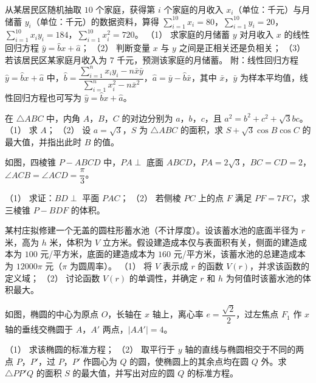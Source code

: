 \begin{question}
从某居民区随机抽取 $10$ 个家庭，获得第 $i$ 个家庭的月收入 $x_i$（单位：千元）与月储蓄 $y_i$（单位：千元）的数据资料，算得 $\sum\limits_{i=1}^{10}x_i=80$，$\sum\limits_{i=1}^{10}y_i=20$，$\sum\limits_{i=1}^{10}x_iy_i=184$，$\sum\limits_{i=1}^{10}x_i^2=720$。
（1） 求家庭的月储蓄 $y$ 对月收入 $x$ 的线性回归方程 $\hat y=\hat bx+\hat a$；
（2） 判断变量 $x$ 与 $y$ 之间是正相关还是负相关；
（3） 若该居民区某家庭月收入为 $7$ 千元，预测该家庭的月储蓄。
附：线性回归方程 $\hat y=\hat bx+\hat a$ 中，$\hat b=\dfrac{\sum\limits_{i=1}^n x_iy_i-n\bar x\bar y}{\sum\limits_{i=1}^n x_i^2-n\bar x^2}$，$\hat a=\bar y-\hat b\bar x$，其中 $\bar x$，$\bar y$ 为样本平均值，线性回归方程也可写为 $\hat y=\hat bx+\hat a$。
\end{question}
\begin{question}
在 $\triangle ABC$ 中，内角 $A$，$B$，$C$ 的对边分别为 $a$，$b$，$c$，且 $a^2=b^2+c^2+\sqrt3bc$。
（1） 求 $A$；
（2） 设 $a=\sqrt3$，$S$ 为 $\triangle ABC$ 的面积，求 $S+\sqrt3\cos B\cos C$ 的最大值，并指出此时 $B$ 的值。
\Needspace{0.4\textheight}
\end{question}
\begin{question}
如图，四棱锥 $P-ABCD$ 中，$PA\perp$ 底面 $ABCD$，$PA=2\sqrt3$，$BC=CD=2$，$\angle ACB=\angle ACD=\dfrac\pi3$。
\nopagebreak[4]
\begin{center}\end{center}
\nopagebreak[4]
（1） 求证：$BD\perp$ 平面 $PAC$；
（2） 若侧棱 $PC$ 上的点 $F$ 满足 $PF=7FC$，求三棱锥 $P-BDF$ 的体积。
\end{question}
\begin{question}
某村庄拟修建一个无盖的圆柱形蓄水池（不计厚度）。设该蓄水池的底面半径为 $r$ 米，高为 $h$ 米，体积为 $V$ 立方米。假设建造成本仅与表面积有关，侧面的建造成本为 $100$ 元/平方米，底面的建造成本为 $160$ 元/平方米，该蓄水池的总建造成本为 $12000\pi$ 元（$\pi$ 为圆周率）。
（1） 将 $V$ 表示成 $r$ 的函数 $V(r)$，并求该函数的定义域；
（2） 讨论函数 $V(r)$ 的单调性，并确定 $r$ 和 $h$ 为何值时该蓄水池的体积最大。
\Needspace{0.4\textheight}
\end{question}
\begin{question}
如图，椭圆的中心为原点 $O$，长轴在 $x$ 轴上，离心率 $e=\dfrac{\sqrt2}2$，过左焦点 $F_1$ 作 $x$ 轴的垂线交椭圆于 $A$，$A'$ 两点，$|AA'|=4$。
\nopagebreak[4]
\begin{center}\end{center}
\nopagebreak[4]
（1） 求该椭圆的标准方程；
（2） 取平行于 $y$ 轴的直线与椭圆相交于不同的两点 $P$，$P'$，过 $P$，$P'$ 作圆心为 $Q$ 的圆，使椭圆上的其余点均在圆 $Q$ 外。求 $\triangle PP'Q$ 的面积 $S$ 的最大值，并写出对应的圆 $Q$ 的标准方程。

\end{question}